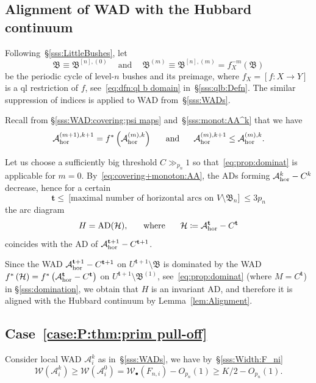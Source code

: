 \documentclass{amsart}
\newcommand{\AD}{{\operatorname{AD}}}
\newcommand{\bbush}{{\boldsymbol {\mathfrak B} }}
\renewcommand{\sp}{{\ \ }}
\newcommand{\1}{{\mathbb 1 }}
\newcommand{\Width}{{\mathcal W}}
\renewcommand{\AA}{{\mathcal A}}
\newcommand{\bbt}{{\mathbf t}}
\begin{document}
\subsection{Alignment of WAD with the Hubbard continuum}\label{sss:alignment with HT} Following~\S\ref{sss:LittleBushes}, let \[\bbush\equiv\bbush^{[n],(0)} \sp\sp \text{ and } \sp\sp \bbush^{(m)}\equiv\bbush^{[n],(m)}=f_X^{-m} (\bbush)\]
 be the periodic cycle of level-$n$ bushes and its preimage, where $f_X=[f\colon X\to Y]$ is a ql restriction of $f$, see~\eqref{eq:dfn:ql b domain} in~\S\ref{sss:qlb:Defn}. The similar suppression of indices is applied to WAD from~\S\ref{sss:WADs}. 


Recall from \S\ref{sss:WAD:covering:psi maps} and~\S\ref{sss:monot:AA^k} that we have 
\begin{equation}
\label{eq:covering+monoton:AA}
\AA^{(m+1),k+1}_{\hor}= f^*\left(\AA^{(m),k}_{\hor}\right)\sp\sp \text{ and }\sp\sp \AA^{(m),k+1}_\hor \le  \AA^{(m),k}_\hor.
\end{equation}






Let us choose a sufficiently big threshold $C\gg_{p_n} 1$ so that~\eqref{eq:prop:dominat} is applicable for $m=0$. By~\eqref{eq:covering+monoton:AA}, the ADs forming $\AA^k_\hor-C^k$ decrease, hence for a certain
\begin{equation}
\label{eq:t:main est}
\bbt\le \  \big[\text{maximal number of horizontal arcs on  $V\setminus \bbush_n$}\big]\ \le 3p_n
\end{equation}
the arc diagram
\begin{equation}
\label{eq:dfn:HH}
H=\AD(\HH), \hspace{0.5cm} \text{ where }\hspace{0.5cm} \HH\coloneqq \AA^\bbt_\hor -  C^\bbt
\end{equation} coincides with the AD of $\AA^{\bbt+1}_\hor - C^{\bbt+1}$.

Since the WAD $\AA^{\bbt+1}_\hor - C^{\bbt+1}$ on $U^{\bbt+1}\setminus \bbush$ is dominated by the WAD $ f^* \left(\HH \right)=f^*\left(\AA^\bbt_\hor -  C^\bbt \right)$ on $U^{\bbt+1}\setminus \bbush^{(1)}$, see~\eqref{eq:prop:dominat} (where $M=C^\bbt$) in \S\ref{sss:domination}, we obtain that $H$ is an invariant AD, and therefore it is aligned with the Hubbard continuum by Lemma~\ref{lem:Alignment}. 


\subsection{Case~\ref{case:P:thm:prim pull-off}} \label{ss:CoverLmm} Consider local WAD $\AA_{i}^{k}$ as in~\S\ref{sss:WADs}, we have by~\S\ref{sss:Width:F_ni}
\begin{equation}
\Width(\AA_{i}^{k}) \ge \Width(\AA_{i}^{0})=\Width_\bullet(F_{n,i})-O_{p_n}(1)\ge K/2-O_{p_n}(1).
\end{equation}
\end{document}
